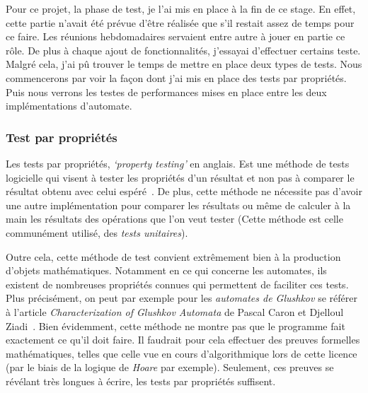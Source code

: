 Pour ce projet, la phase de test, je l'ai mis en place à la fin de ce stage. En
effet, cette partie n'avait été prévue d'être réalisée que s'il restait assez de
temps pour ce faire. Les réunions hebdomadaires servaient entre autre à jouer en
partie ce rôle. De plus à chaque ajout de fonctionnalités, j'essayai d'effectuer
certains teste. Malgré cela, j'ai pû trouver le temps de mettre en place deux
types de tests. Nous commencerons par voir la façon dont j'ai mis en place
des tests par propriétés. Puis nous verrons les testes de performances mises en
place entre les deux implémentations d'automate.

\subsubsection{Test par propriétés}

Les tests par propriétés, \textit{`property testing'} en anglais. Est une
méthode de tests logicielle qui visent à tester les propriétés d'un résultat et
non pas à comparer le résultat obtenu avec celui espéré~\cite{propertyTesting}.
De plus, cette méthode ne nécessite pas d'avoir une autre implémentation pour
comparer les résultats ou même de calculer à la main les résultats des
opérations que l'on veut tester (Cette méthode est celle communément utilisé,
des \textit{tests unitaires}).

\vphantom{}

Outre cela, cette méthode de test convient extrêmement bien à la production
d'objets mathématiques. Notamment en ce qui concerne les automates, ils existent
de nombreuses propriétés connues qui permettent de faciliter ces tests. Plus
précisément, on peut par exemple pour les \textit{automates de Glushkov} se
référer à l'article \textit{Characterization of Glushkov Automata} de Pascal
Caron et Djelloul Ziadi~\cite{CaronZiadi2001}. Bien évidemment, cette méthode ne
montre pas que le programme fait exactement ce qu'il doit faire. Il faudrait
pour cela effectuer des preuves formelles mathématiques, telles que celle vue en
cours d'algorithmique lors de cette licence (par le biais de la logique de
\textit{Hoare} par exemple). Seulement, ces preuves se révélant très longues à
écrire, les tests par propriétés suffisent.

\vphantom{}

